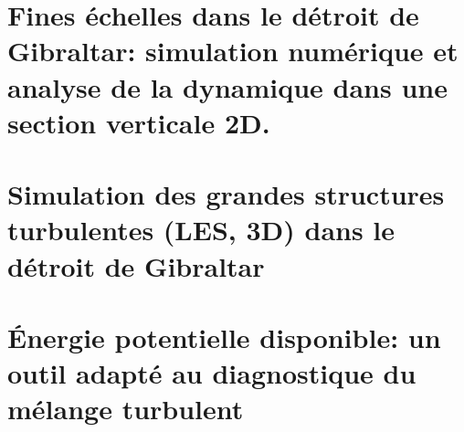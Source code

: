 \documentclass[a4paper,12pt,notitlepage,twoside]{report}
\numberwithin{equation}{section}
\begin{document}


\chapter{Fines échelles dans le détroit de Gibraltar: simulation numérique et analyse de la dynamique dans une section verticale 2D.}
\label{chapGBR2D}


%



\chapter{Simulation des grandes structures turbulentes (LES, 3D) dans le détroit de Gibraltar}
\label{chapGBR3D}
 





\chapter{Énergie potentielle disponible: un outil adapté au diagnostique du mélange turbulent}
\label{chapBPE}
\end{document}
